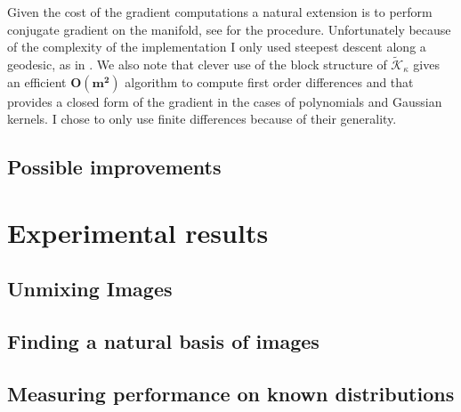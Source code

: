 \documentclass[a4paper,BCOR=5mm,oneside,openany]{scrreprt}
\begin{document}
Given the cost of the gradient computations a natural extension is to perform conjugate gradient on the manifold, see \cite{Edelman1998} for the procedure. Unfortunately because of the complexity of the implementation I only used steepest descent along a geodesic, as in \cite{Bach2002}. We also note that clever use of the block structure of $\tilde{\mathcal{K}}_\kappa $ gives an efficient $\mathbf {O(m^2)}$ algorithm to compute first order differences and that \cite{Bach2002} provides a closed form of the gradient in the cases of polynomials and Gaussian kernels. I chose to only use finite differences because of their generality.


\section{Possible improvements}

\chapter{Experimental results}

\section{Unmixing Images}

\section{Finding a natural basis of images}

\section{Measuring performance on known distributions}

\appendix

\listoftodos

\printbibliography
\end{document}
